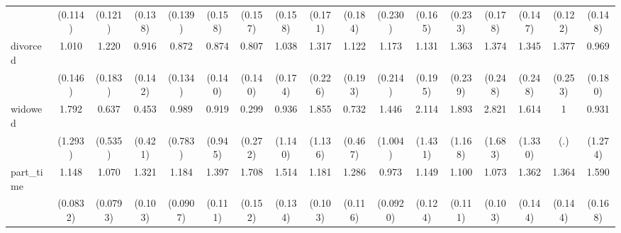 {\begin{tabular}{l*{16}{c}}
                    &     (0.114)         &     (0.121)         &     (0.138)         &     (0.139)         &     (0.158)         &     (0.157)         &     (0.158)         &     (0.171)         &     (0.184)         &     (0.230)         &     (0.165)         &     (0.233)         &     (0.178)         &     (0.147)         &     (0.122)         &     (0.148)         \\
[1em]
divorced            &       1.010         &       1.220         &       0.916         &       0.872         &       0.874         &       0.807         &       1.038         &       1.317         &       1.122         &       1.173         &       1.131         &       1.363         &       1.374         &       1.345         &       1.377         &       0.969         \\
                    &     (0.146)         &     (0.183)         &     (0.142)         &     (0.134)         &     (0.140)         &     (0.140)         &     (0.174)         &     (0.226)         &     (0.193)         &     (0.214)         &     (0.195)         &     (0.239)         &     (0.248)         &     (0.248)         &     (0.253)         &     (0.180)         \\
[1em]
widowed             &       1.792         &       0.637         &       0.453         &       0.989         &       0.919         &       0.299         &       0.936         &       1.855         &       0.732         &       1.446         &       2.114         &       1.893         &       2.821         &       1.614         &           1         &       0.931         \\
                    &     (1.293)         &     (0.535)         &     (0.421)         &     (0.783)         &     (0.945)         &     (0.272)         &     (1.140)         &     (1.136)         &     (0.467)         &     (1.004)         &     (1.431)         &     (1.168)         &     (1.683)         &     (1.330)         &         (.)         &     (1.274)         \\
[1em]
part\_time           &       1.148         &       1.070         &       1.321\sym{***}&       1.184\sym{*}  &       1.397\sym{***}&       1.708\sym{***}&       1.514\sym{***}&       1.181         &       1.286\sym{**} &       0.973         &       1.149         &       1.100         &       1.073         &       1.362\sym{**} &       1.364\sym{**} &       1.590\sym{***}\\
                    &    (0.0832)         &    (0.0793)         &     (0.103)         &    (0.0907)         &     (0.111)         &     (0.152)         &     (0.134)         &     (0.103)         &     (0.116)         &    (0.0920)         &     (0.124)         &     (0.111)         &     (0.103)         &     (0.144)         &     (0.144)         &     (0.168)         \\

\end{tabular}}
